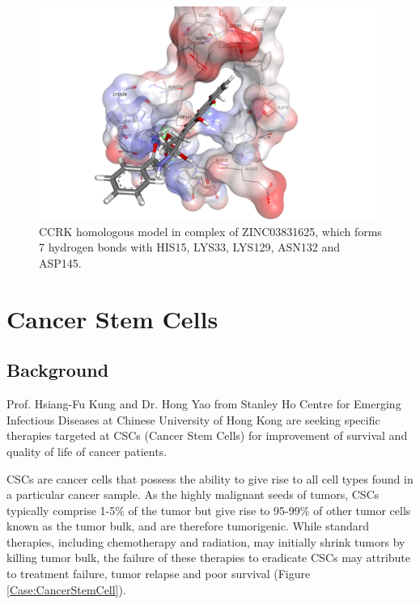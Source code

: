\begin{figure}
\centering
\includegraphics[width=\linewidth]{Case/1HCL-ZINC03831625.png}
\caption{CCRK homologous model in complex of ZINC03831625, which forms 7 hydrogen bonds with HIS15, LYS33, LYS129, ASN132 and ASP145.}
\label{Case:1HCL-ZINC03831625}
\end{figure}

\section{Cancer Stem Cells}

\subsection{Background}

Prof. Hsiang-Fu Kung and Dr. Hong Yao from Stanley Ho Centre for Emerging Infectious Diseases at Chinese University of Hong Kong are seeking specific therapies targeted at CSCs (Cancer Stem Cells) for improvement of survival and quality of life of cancer patients.

CSCs are cancer cells that possess the ability to give rise to all cell types found in a particular cancer sample. As the highly malignant seeds of tumors, CSCs typically comprise 1-5\% of the tumor but give rise to 95-99\% of other tumor cells known as the tumor bulk, and are therefore tumorigenic. While standard therapies, including chemotherapy and radiation, may initially shrink tumors by killing tumor bulk, the failure of these therapies to eradicate CSCs may attribute to treatment failure, tumor relapse and poor survival (Figure \ref{Case:CancerStemCell}).

